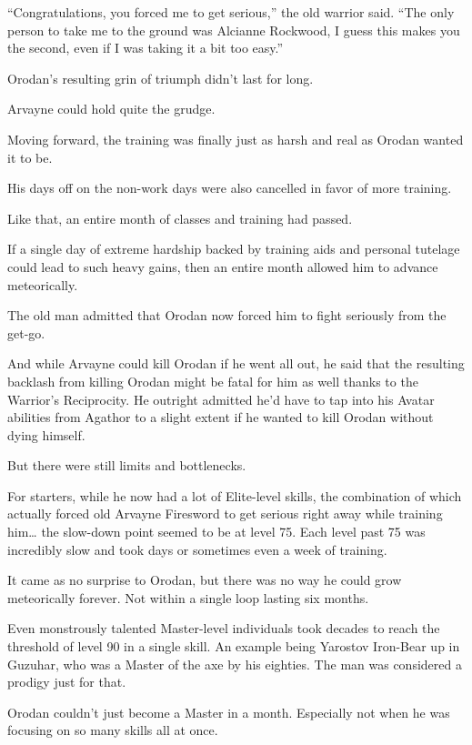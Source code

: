 \documentclass[a4paper,10pt]{book}
\begin{document}
“Congratulations, you forced me to get serious,” the old warrior said. “The only person to take me to the ground was Alcianne Rockwood, I guess this makes you the second, even if I was taking it a bit too easy.”\par
Orodan’s resulting grin of triumph didn’t last for long.\par
Arvayne could hold quite the grudge.\par
Moving forward, the training was finally just as harsh and real as Orodan wanted it to be.\par
His days off on the non-work days were also cancelled in favor of more training.\par
\par
Like that, an entire month of classes and training had passed.\par
If a single day of extreme hardship backed by training aids and personal tutelage could lead to such heavy gains, then an entire month allowed him to advance meteorically.\par
The old man admitted that Orodan now forced him to fight seriously from the get-go.\par
And while Arvayne could kill Orodan if he went all out, he said that the resulting backlash from killing Orodan might be fatal for him as well thanks to the Warrior’s Reciprocity. He outright admitted he’d have to tap into his Avatar abilities from Agathor to a slight extent if he wanted to kill Orodan without dying himself.\par
But there were still limits and bottlenecks.\par
For starters, while he now had a lot of Elite-level skills, the combination of which actually forced old Arvayne Firesword to get serious right away while training him… the slow-down point seemed to be at level 75. Each level past 75 was incredibly slow and took days or sometimes even a week of training.\par
It came as no surprise to Orodan, but there was no way he could grow meteorically forever. Not within a single loop lasting six months.\par
Even monstrously talented Master-level individuals took decades to reach the threshold of level 90 in a single skill. An example being Yarostov Iron-Bear up in Guzuhar, who was a Master of the axe by his eighties. The man was considered a prodigy just for that.\par
Orodan couldn’t just become a Master in a month. Especially not when he was focusing on so many skills all at once.\par
\end{document}
